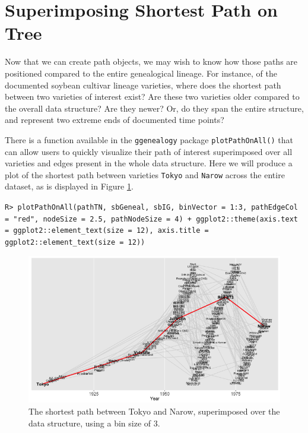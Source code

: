 \documentclass[11pt,a4paper,oldfontcommands,openany]{memoir}
\DeclareRobustCommand{\mybox}[2][gray!15]{%
\begin{tcolorbox}[   %
        breakable,
        left=0pt,
        right=0pt,
        top=0pt,
        bottom=0pt,
        colback=#1,
        colframe=#1,
        width=\dimexpr\textwidth\relax, 
        enlarge left by=0mm,
        boxsep=5pt,
        arc=0pt,outer arc=0pt,
        ]
        #2
\end{tcolorbox}
}
\numberwithin{equation}{section} %
\newcommand{\code}[1]{{\texttt{#1}}}
\newcommand{\pkg}[1]{{\texttt{#1}}}
\begin{document}
\section{Superimposing Shortest Path on Tree}

Now that we can create path objects, we may wish to know how those paths are positioned compared to the entire genealogical lineage. For instance, of the documented soybean cultivar lineage varieties, where does the shortest path between two varieties of interest exist? Are these two varieties older compared to the overall data structure? Are they newer? Or, do they span the entire structure, and represent two extreme ends of documented time points?

There is a function available in the \pkg{ggenealogy} package \code{plotPathOnAll()} that can allow users to quickly visualize their path of interest superimposed over all varieties and edges present in the whole data structure. Here we will produce a plot of the shortest path between varieties \code{Tokyo} and \code{Narow} across the entire dataset, as is displayed in Figure \ref{fig:plotTNBin3}.

\mybox{
\texttt{R> plotPathOnAll(pathTN, sbGeneal, sbIG, binVector = 1:3, pathEdgeCol = "red", nodeSize = 2.5, pathNodeSize = 4) + ggplot2::theme(axis.text = ggplot2::element\_text(size = 12), axis.title = ggplot2::element\_text(size = 12))}
}

\begin{figure}%
    \centering
    \includegraphics[width=\textwidth]{plotTNBin3}
    \caption{The shortest path between Tokyo and Narow, superimposed over the data structure, using a bin size of 3.}
    \label{fig:plotTNBin3}
\end{figure}
\end{document}
